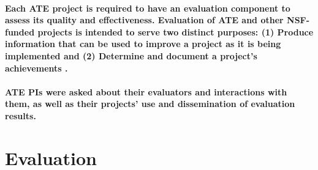 \documentclass[
]{report}
\begin{document}
\hypertarget{each-ate-project-is-required-to-have-an-evaluation-component-to-assess-its-quality-and-effectiveness.-evaluation-of-ate-and-other-nsf-funded-projects-is-intended-to-serve-two-distinct-purposes-1-produce-information-that-can-be-used-to-improve-a-project-as-it-is-being-implemented-and-2-determine-and-document-a-projects-achievements-frechtling2010user.}{%
\paragraph{\texorpdfstring{Each ATE project is required to have an evaluation component to assess its quality and effectiveness. Evaluation of ATE and other NSF-funded projects is intended to serve two distinct purposes: (1) Produce information that can be used to improve a project as it is being implemented and (2) Determine and document a project's achievements \autocite{frechtling2010user}.}{Each ATE project is required to have an evaluation component to assess its quality and effectiveness. Evaluation of ATE and other NSF-funded projects is intended to serve two distinct purposes: (1) Produce information that can be used to improve a project as it is being implemented and (2) Determine and document a project's achievements {[}@frechtling2010user{]}.}}\label{each-ate-project-is-required-to-have-an-evaluation-component-to-assess-its-quality-and-effectiveness.-evaluation-of-ate-and-other-nsf-funded-projects-is-intended-to-serve-two-distinct-purposes-1-produce-information-that-can-be-used-to-improve-a-project-as-it-is-being-implemented-and-2-determine-and-document-a-projects-achievements-frechtling2010user.}}

\hypertarget{ate-pis-were-asked-about-their-evaluators-and-interactions-with-them-as-well-as-their-projects-use-and-dissemination-of-evaluation-results.}{%
\paragraph{ATE PIs were asked about their evaluators and interactions with them, as well as their projects' use and dissemination of evaluation results.}\label{ate-pis-were-asked-about-their-evaluators-and-interactions-with-them-as-well-as-their-projects-use-and-dissemination-of-evaluation-results.}}

\hypertarget{evaluation-1}{%
\section{Evaluation}\label{evaluation-1}}
\end{document}
